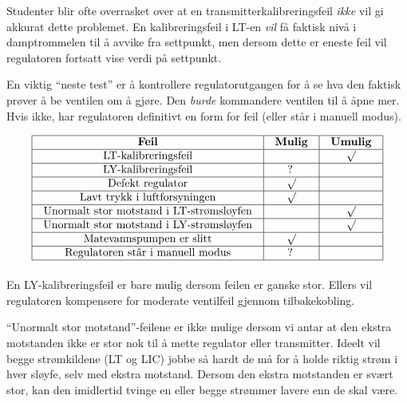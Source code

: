 Studenter blir ofte overrasket over at en transmitterkalibreringsfeil {\it ikke} vil gi akkurat dette problemet. En kalibreringsfeil i LT-en {\it vil} få faktisk nivå i damptrommelen til å avvike fra settpunkt, men dersom dette er eneste feil vil regulatoren fortsatt vise verdi på settpunkt.

\vskip 10pt

En viktig ``neste test'' er å kontrollere regulatorutgangen for å se hva den faktisk prøver å be ventilen om å gjøre. Den {\it burde} kommandere ventilen til å åpne mer. Hvis ikke, har regulatoren definitivt en form for feil (eller står i manuell modus).








$$\vbox{\offinterlineskip
\halign{\strut
\vrule \quad\hfil # \ \hfil & 
\vrule \quad\hfil # \ \hfil & 
\vrule \quad\hfil # \ \hfil \vrule \cr
\noalign{\hrule}
%
{\bf Feil} & {\bf Mulig} & {\bf Umulig} \cr
%
\noalign{\hrule}
%
LT-kalibreringsfeil &  & $\surd$ \cr
%
\noalign{\hrule}
%
LY-kalibreringsfeil & ? &  \cr
%
\noalign{\hrule}
%
Defekt regulator & $\surd$ &  \cr
%
\noalign{\hrule}
%
Lavt trykk i luftforsyningen & $\surd$ &  \cr
%
\noalign{\hrule}
%
Unormalt stor motstand i LT-strømsløyfen &  & $\surd$ \cr
%
\noalign{\hrule}
%
Unormalt stor motstand i LY-strømsløyfen &  & $\surd$ \cr
%
\noalign{\hrule}
%
Matevannspumpen er slitt & $\surd$ &  \cr
%
\noalign{\hrule}
%
Regulatoren står i manuell modus & ? &  \cr
%
\noalign{\hrule}
} %
}$$ %

En LY-kalibreringsfeil er bare mulig dersom feilen er ganske stor. Ellers vil regulatoren kompensere for moderate ventilfeil gjennom tilbakekobling.

``Unormalt stor motstand''-feilene er ikke mulige dersom vi antar at den ekstra motstanden ikke er stor nok til å mette regulator eller transmitter. Ideelt vil begge strømkildene (LT og LIC) jobbe så hardt de må for å holde riktig strøm i hver sløyfe, selv med ekstra motstand. Dersom den ekstra motstanden er svært stor, kan den imidlertid tvinge en eller begge strømmer lavere enn de skal være.

